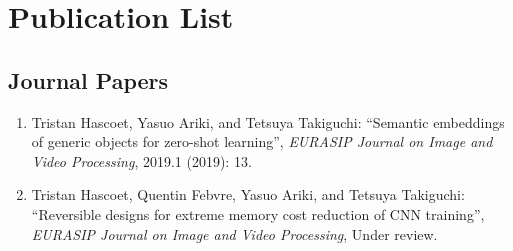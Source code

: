 


\chapter {Publication List}       %
\label{chap:PubList}

\section*{Journal Papers}
\begin{enumerate}

\item Tristan Hascoet, Yasuo Ariki, and Tetsuya Takiguchi:
``Semantic embeddings of generic objects for zero-shot learning'',
\textit{EURASIP Journal on Image and Video Processing}, 2019.1 (2019): 13.

\item Tristan Hascoet, Quentin Febvre, Yasuo Ariki, and Tetsuya Takiguchi:
``Reversible designs for extreme memory cost reduction of CNN training'',
\textit{EURASIP Journal on Image and Video Processing}, Under review.

\end{enumerate}

